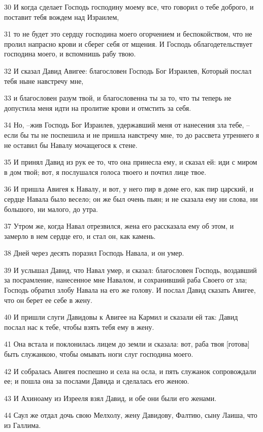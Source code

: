 \par 30 И когда сделает Господь господину моему все, что говорил о тебе доброго, и поставит тебя вождем над Израилем,
\par 31 то не будет это сердцу господина моего огорчением и беспокойством, что не пролил напрасно крови и сберег себя от мщения. И Господь облагодетельствует господина моего, и вспомнишь рабу твою.
\par 32 И сказал Давид Авигее: благословен Господь Бог Израилев, Который послал тебя ныне навстречу мне,
\par 33 и благословен разум твой, и благословенна ты за то, что ты теперь не допустила меня идти на пролитие крови и отмстить за себя.
\par 34 Но, --жив Господь Бог Израилев, удержавший меня от нанесения зла тебе, --если бы ты не поспешила и не пришла навстречу мне, то до рассвета утреннего я не оставил бы Навалу мочащегося к стене.
\par 35 И принял Давид из рук ее то, что она принесла ему, и сказал ей: иди с миром в дом твой; вот, я послушался голоса твоего и почтил лице твое.
\par 36 И пришла Авигея к Навалу, и вот, у него пир в доме его, как пир царский, и сердце Навала было весело; он же был очень пьян; и не сказала ему ни слова, ни большого, ни малого, до утра.
\par 37 Утром же, когда Навал отрезвился, жена его рассказала ему об этом, и замерло в нем сердце его, и стал он, как камень.
\par 38 Дней через десять поразил Господь Навала, и он умер.
\par 39 И услышал Давид, что Навал умер, и сказал: благословен Господь, воздавший за посрамление, нанесенное мне Навалом, и сохранивший раба Своего от зла; Господь обратил злобу Навала на его же голову. И послал Давид сказать Авигее, что он берет ее себе в жену.
\par 40 И пришли слуги Давидовы к Авигее на Кармил и сказали ей так: Давид послал нас к тебе, чтобы взять тебя ему в жену.
\par 41 Она встала и поклонилась лицем до земли и сказала: вот, раба твоя [готова] быть служанкою, чтобы омывать ноги слуг господина моего.
\par 42 И собралась Авигея поспешно и села на осла, и пять служанок сопровождали ее; и пошла она за послами Давида и сделалась его женою.
\par 43 И Ахиноаму из Изрееля взял Давид, и обе они были его женами.
\par 44 Саул же отдал дочь свою Мелхолу, жену Давидову, Фалтию, сыну Лаиша, что из Галлима.


